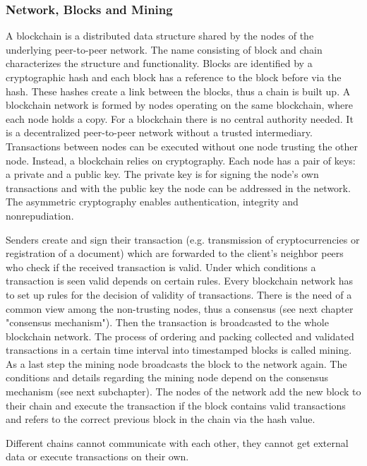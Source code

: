 \documentclass[conference]{IEEEtran}
\begin{document}
\subsubsection{Network, Blocks and Mining}
A blockchain is a distributed data structure shared by the nodes of the underlying peer-to-peer network. The name consisting of block and chain characterizes the structure and functionality. Blocks are identified by a cryptographic hash and each block has a reference to the block before via the hash. These hashes create a link between the blocks, thus a chain is built up. A blockchain network is formed by nodes operating on the same blockchain, where each node holds a copy. For a blockchain there is no central authority needed. It is a decentralized peer-to-peer network without a trusted intermediary. Transactions between nodes can be executed without one node trusting the other node. Instead, a blockchain relies on cryptography. Each node has a pair of keys: a private and a public key. The private key is for signing the node's own transactions and with the public key the node can be addressed in the network. The asymmetric cryptography enables authentication, integrity and nonrepudiation.  \cite{Christidis2016} \par
Senders create and sign their transaction (e.g. transmission of cryptocurrencies or registration of a document) which are forwarded to the client's neighbor peers who check if the received transaction is valid. Under which conditions a transaction is seen valid depends on certain rules. Every blockchain network has to set up rules for the decision of validity of transactions. There is the need of a common view among the non-trusting nodes, thus a consensus (see next chapter "consensus mechanism"). Then the transaction is broadcasted to the whole blockchain network. The process of ordering and packing collected and validated transactions in a certain time interval into timestamped blocks is called mining. As a last step the mining node broadcasts the block to the network again. The conditions and details regarding the mining node depend on the consensus mechanism (see next subchapter). The nodes of the network add the new block to their chain and execute the transaction if the block contains valid transactions and refers to the correct previous block in the chain via the hash value. \cite{Christidis2016} \cite{Prinz2017} \par
Different chains cannot communicate with each other, they cannot get external data or execute transactions on their own. \cite{Wang2017} \par 
\end{document}
